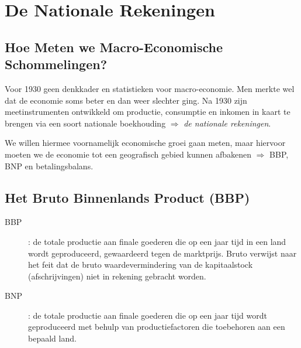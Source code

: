 \section{De Nationale Rekeningen}
\subsection{Hoe Meten we Macro-Economische Schommelingen?}
Voor 1930 geen denkkader en statistieken voor macro-economie. Men merkte wel dat de economie soms beter en dan weer slechter ging. Na 1930 zijn meetinstrumenten ontwikkeld om productie, consumptie en inkomen in kaart te brengen via een soort nationale boekhouding $\Rightarrow$ \textit{de nationale rekeningen}.

We willen hiermee voornamelijk economische groei gaan meten, maar hiervoor moeten we de economie tot een geografisch gebied kunnen afbakenen $\Rightarrow$ BBP, BNP en betalingsbalans.

\subsection{Het Bruto Binnenlands Product (BBP)}
\begin{description}
    \item[BBP]: de totale productie aan finale goederen die op een jaar tijd in een land wordt geproduceerd, gewaardeerd tegen de marktprijs. Bruto verwijst naar het feit dat de bruto waardevermindering van de kapitaalstock (afschrijvingen) niet in rekening gebracht worden.

    \item[BNP]: de totale productie aan finale goederen die op een jaar tijd wordt geproduceerd met behulp van productiefactoren die toebehoren aan een bepaald land.
\end{description}

